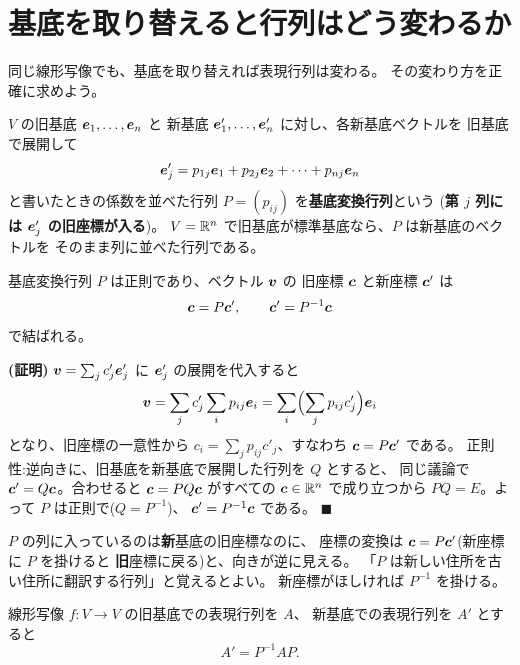 \section{基底を取り替えると行列はどう変わるか}

同じ線形写像でも、基底を取り替えれば表現行列は変わる。
その変わり方を正確に求めよう。

\begin{teigi}[基底変換行列]\label{def:changebasis}
$V$ の旧基底 $\bm{e}_1, \dots, \bm{e}_n$ と
新基底 $\bm{e}'_1, \dots, \bm{e}'_n$ に対し、各新基底ベクトルを
旧基底で展開して
\[
\bm{e}'_j = p_{1j}\bm{e}_1 + p_{2j}\bm{e}_2 + \cdots + p_{nj}\bm{e}_n
\]
と書いたときの係数を並べた行列 $P = (p_{ij})$ を\textbf{基底変換行列}という
(\textbf{第 $j$ 列には $\bm{e}'_j$ の旧座標が入る})。
$V = \mathbb{R}^n$ で旧基底が標準基底なら、$P$ は新基底のベクトルを
そのまま列に並べた行列である。
\end{teigi}

\begin{teiri}[座標の変換則]\label{thm:coordchange}
基底変換行列 $P$ は正則であり、ベクトル $\bm{v}$ の
旧座標 $\bm{c}$ と新座標 $\bm{c}'$ は
\[
\bm{c} = P\bm{c}', \qquad \bm{c}' = P^{-1}\bm{c}
\]
で結ばれる。
\end{teiri}

\noindent\textbf{(証明)}\quad
$\bm{v} = \sum_j c'_j \bm{e}'_j$ に $\bm{e}'_j$ の展開を代入すると
\[
\bm{v} = \sum_j c'_j \sum_i p_{ij}\bm{e}_i
= \sum_i \Bigl( \sum_j p_{ij}c'_j \Bigr) \bm{e}_i
\]
となり、旧座標の一意性から $c_i = \sum_j p_{ij}c'_j$、すなわち
$\bm{c} = P\bm{c}'$ である。
正則性:逆向きに、旧基底を新基底で展開した行列を $Q$ とすると、
同じ議論で $\bm{c}' = Q\bm{c}$。合わせると
$\bm{c} = PQ\bm{c}$ がすべての $\bm{c} \in \mathbb{R}^n$ で成り立つから
$PQ = E$。よって $P$ は正則で($Q = P^{-1}$)、
$\bm{c}' = P^{-1}\bm{c}$ である。 $\blacksquare$

\begin{chui}[向きに注意]
$P$ の列に入っているのは\textbf{新}基底の旧座標なのに、
座標の変換は $\bm{c} = P\bm{c}'$(新座標に $P$ を掛けると
\textbf{旧}座標に戻る)と、向きが逆に見える。
「$P$ は新しい住所を古い住所に翻訳する行列」と覚えるとよい。
新座標がほしければ $P^{-1}$ を掛ける。
\end{chui}

\begin{teiri}[表現行列の変換則]\label{thm:repmat-change}
線形写像 $f : V \to V$ の旧基底での表現行列を $A$、
新基底での表現行列を $A'$ とすると
\[
A' = P^{-1} A P.
\]
\end{teiri}

